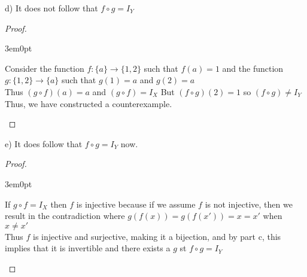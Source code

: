 \documentclass[11pt]{article}
\newcommand{\bproof}{\begin{proof}
$ $ \\
\begin{adjustwidth}{3em}{0pt}
}
\newcommand{\eproof}{\end{adjustwidth}
\end{proof}}
\begin{document}
\begin{flushleft}
d) It does not follow that $f \circ g = I_Y$ \\

\bproof
Consider the function $f:\{ a \} \rightarrow \{ 1,2 \}$ such that $f(a) = 1$ 
and the function $g:\{ 1,2 \} \rightarrow \{ a \}$ such that $g(1) = a$ and $g(2) = a$ \\
Thus $(g \circ f)(a) = a$ and $(g \circ f) = I_X$
But $(f \circ g)(2) = 1$ so $(f \circ g) \neq I_Y$ \\
Thus, we have constructed a counterexample.
\eproof

e) It does follow that $f \circ g = I_Y$ now.

\bproof
If $g \circ f = I_X$ then $f$ is injective because if we assume $f$ is not injective, then we result in the contradiction where $g(f(x)) = g(f(x')) = x = x'$ when $x \neq x'$ \\
Thus $f$ is injective and surjective, making it a bijection, and by part c, this implies that it is invertible and there exists a $g$ st $f \circ g = I_Y$
\eproof


\end{flushleft}
\end{document}
